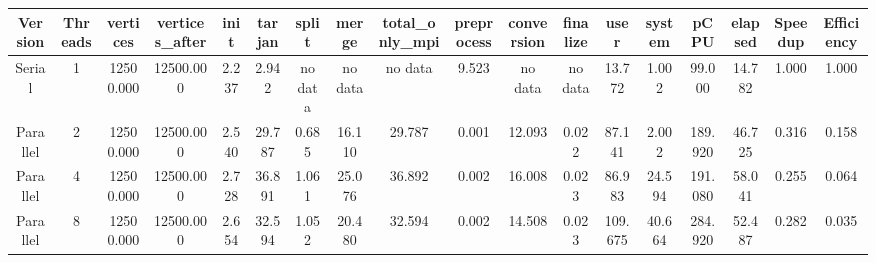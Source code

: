 \begin{tabular}{|c|c|c|c|c|c|c|c|c|c|c|c|c|c|c|c|c|c|}
\toprule
 Version &  Threads &  vertices &  vertices\_after &  init &  tarjan &   split &   merge & total\_only\_mpi &  preprocess & conversion & finalize &    user &  system &    pCPU &  elapsed &  Speedup &  Efficiency \\
\midrule
  Serial &        1 & 12500.000 &       12500.000 & 2.237 &   2.942 & no data & no data &        no data &       9.523 &    no data &  no data &  13.772 &   1.002 &  99.000 &   14.782 &    1.000 &       1.000 \\
Parallel &        2 & 12500.000 &       12500.000 & 2.540 &  29.787 &   0.685 &  16.110 &         29.787 &       0.001 &     12.093 &    0.022 &  87.141 &   2.002 & 189.920 &   46.725 &    0.316 &       0.158 \\
Parallel &        4 & 12500.000 &       12500.000 & 2.728 &  36.891 &   1.061 &  25.076 &         36.892 &       0.002 &     16.008 &    0.023 &  86.983 &  24.594 & 191.080 &   58.041 &    0.255 &       0.064 \\
Parallel &        8 & 12500.000 &       12500.000 & 2.654 &  32.594 &   1.052 &  20.480 &         32.594 &       0.002 &     14.508 &    0.023 & 109.675 &  40.664 & 284.920 &   52.487 &    0.282 &       0.035 \\
\bottomrule
\end{tabular}
